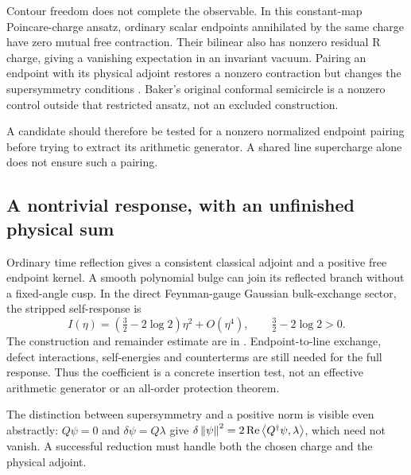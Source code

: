 Contour freedom does not complete the observable. In this
constant-map Poincare-charge ansatz, ordinary scalar endpoints
annihilated by the same charge have zero mutual free contraction.
Their bilinear also has nonzero residual R charge, giving a
vanishing expectation in an invariant vacuum. Pairing an endpoint
with its physical adjoint restores a nonzero contraction but changes
the supersymmetry conditions
\cite[Section~S6]{Supplement}. Baker's original conformal
semicircle is a nonzero control outside that restricted ansatz,
not an excluded construction.

A candidate should therefore be tested for a nonzero normalized
endpoint pairing before trying to extract its arithmetic generator.
A shared line supercharge alone does not ensure such a pairing.

\subsection{A nontrivial response, with an unfinished physical sum}

Ordinary time reflection gives a consistent classical adjoint and
a positive free endpoint kernel. A smooth polynomial bulge can
join its reflected branch without a fixed-angle cusp. In the
direct Feynman-gauge Gaussian bulk-exchange sector, the stripped
self-response is
\begin{equation}
 I(\eta)=\left(\tfrac32-2\log2\right)\eta^2+O(\eta^4),
 \qquad \tfrac32-2\log2>0.
\end{equation}
The construction and remainder estimate are in
\cite[Sections~S7--S8]{Supplement}.
Endpoint-to-line exchange, defect interactions, self-energies and
counterterms are still needed for the full response. Thus the
coefficient is a concrete insertion test, not an effective
arithmetic generator or an all-order protection theorem.

The distinction between supersymmetry and a positive norm is
visible even abstractly: $Q\psi=0$ and $\delta\psi=Q\lambda$
give $\delta\left\lVert\psi\right\rVert^2=2\operatorname{Re}\left\langle Q^\dagger\psi,\lambda\right\rangle$,
which need not vanish. A successful reduction must handle both
the chosen charge and the physical adjoint.
